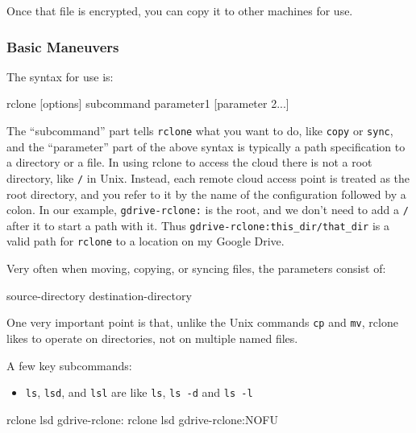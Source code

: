 \documentclass[]{krantz}
\makeatletter
\newenvironment{Shaded}{\begin{snugshade}}{\end{snugshade}}
\newcommand{\ExtensionTok}[1]{#1}
\newcommand{\NormalTok}[1]{#1}
\providecommand{\tightlist}{%
  \setlength{\itemsep}{0pt}\setlength{\parskip}{0pt}}
\newenvironment{kframe}{%
\medskip{}
\setlength{\fboxsep}{.8em}
 \def\at@end@of@kframe{}%
 \ifinner\ifhmode%
  \def\at@end@of@kframe{\end{minipage}}%
  \begin{minipage}{\columnwidth}%
 \fi\fi%
 \def\FrameCommand##1{\hskip\@totalleftmargin \hskip-\fboxsep
 \colorbox{shadecolor}{##1}\hskip-\fboxsep
     \hskip-\linewidth \hskip-\@totalleftmargin \hskip\columnwidth}%
 \MakeFramed {\advance\hsize-\width
   \@totalleftmargin\z@ \linewidth\hsize
   \@setminipage}}%
 {\par\unskip\endMakeFramed%
 \at@end@of@kframe}
\renewenvironment{Shaded}{\begin{kframe}}{\end{kframe}}
\makeatother
\begin{document}
Once that file is encrypted, you can copy it to other machines for use.

\hypertarget{basic-maneuvers}{%
\subsubsection{Basic Maneuvers}\label{basic-maneuvers}}

The syntax for use is:

\begin{Shaded}
\begin{Highlighting}[]
\ExtensionTok{rclone}\NormalTok{ [options] subcommand  parameter1 [parameter 2...]}
\end{Highlighting}
\end{Shaded}

The ``subcommand'' part tells \texttt{rclone} what you want to do, like \texttt{copy} or \texttt{sync}, and
the ``parameter'' part of the above syntax is typically a path
specification to a directory or a file. In using rclone to access the
cloud there is not a root directory, like \texttt{/} in Unix. Instead, each remote
cloud access point is treated as the root directory, and you refer to it
by the name of the configuration followed by a colon. In our example,
\texttt{gdrive-rclone:} is the root, and we don't need to add a \texttt{/} after it to
start a path with it. Thus \texttt{gdrive-rclone:this\_dir/that\_dir} is a
valid path for \texttt{rclone} to a location on my Google Drive.

Very often when moving, copying, or syncing files, the parameters
consist of:

\begin{Shaded}
\begin{Highlighting}[]
\NormalTok{source-directory  destination-directory}
\end{Highlighting}
\end{Shaded}

One very important point is that, unlike the Unix commands \texttt{cp} and \texttt{mv}, rclone
likes to operate on directories, not on multiple named files.

A few key subcommands:

\begin{itemize}
\tightlist
\item
  \texttt{ls}, \texttt{lsd}, and \texttt{lsl} are like \texttt{ls}, \texttt{ls\ -d} and \texttt{ls\ -l}
\end{itemize}

\begin{Shaded}
\begin{Highlighting}[]
\ExtensionTok{rclone}\NormalTok{  lsd gdrive-rclone:}
\ExtensionTok{rclone}\NormalTok{  lsd gdrive-rclone:NOFU}
\end{Highlighting}
\end{Shaded}
\end{document}
